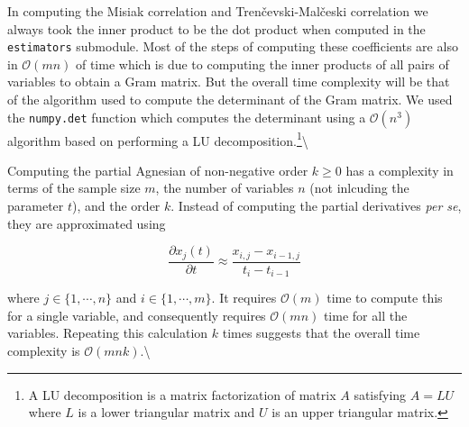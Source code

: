 \documentclass[
  letterpaper,
  DIV=11,
  numbers=noendperiod]{scrreprt}
\begin{document}
In computing the Misiak correlation and Tren\v cevski-Mal\v ceski
correlation we always took the inner product to be the dot product when
computed in the \texttt{estimators} submodule. Most of the steps of
computing these coefficients are also in \(\mathcal{O}(mn)\) of time
which is due to computing the inner products of all pairs of variables
to obtain a Gram matrix. But the overall time complexity will be that of
the algorithm used to compute the determinant of the Gram matrix. We
used the \texttt{numpy.det} function which computes the determinant
using a \(\mathcal{O}(n^3)\) algorithm based on performing a LU
decomposition.\footnote{A LU decomposition is a matrix factorization of matrix $A$ satisfying $A=LU$ where $L$ is a lower triangular matrix and $U$ is an upper triangular matrix.}\textbackslash{}

Computing the partial Agnesian of non-negative order \(k \geq 0\) has a
complexity in terms of the sample size \(m\), the number of variables
\(n\) (not inlcuding the parameter \(t\)), and the order \(k\). Instead
of computing the partial derivatives \textit{per se}, they are
approximated using

\[\frac{\partial x_j(t)}{\partial t} \approx \frac{x_{i,j} - x_{i-1,j}}{t_i - t_{i-1}}\]

where \(j \in \{ 1, \cdots, n \}\) and \(i \in \{ 1, \cdots, m \}\). It
requires \(\mathcal{O}(m)\) time to compute this for a single variable,
and consequently requires \(\mathcal{O}(mn)\) time for all the
variables. Repeating this calculation \(k\) times suggests that the
overall time complexity is \(\mathcal{O}(mnk)\).\textbackslash{}
\end{document}
